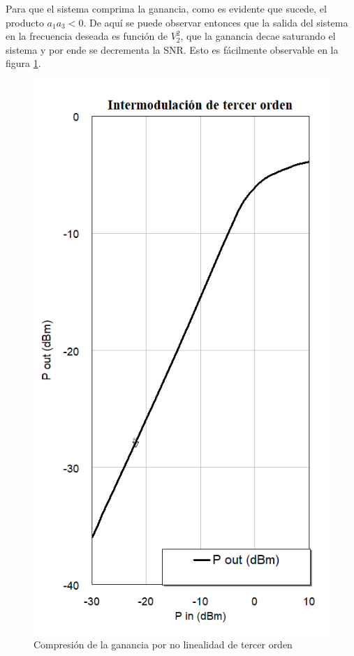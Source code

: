 \documentclass[12pt]{report}
\begin{document}
Para que el sistema comprima la ganancia, como es evidente que sucede, el producto \(a_1 a_3 < 0\). De aquí se puede observar entonces que
la salida del sistema en la frecuencia deseada es función de \(V_2^{2}\), que la ganancia decae saturando el sistema y por ende se decrementa 
la SNR. Esto es fácilmente observable en la figura \ref{no_linealidad_e_tercer_orden}.

\begin{figure}[htb]
	\centering
	\includegraphics[scale=0.4]{no_linealidad_e_tercer_orden.png}
	\caption{Compresión de la ganancia por no linealidad de tercer orden}
	\label{no_linealidad_e_tercer_orden}
\end{figure}
\end{document}
